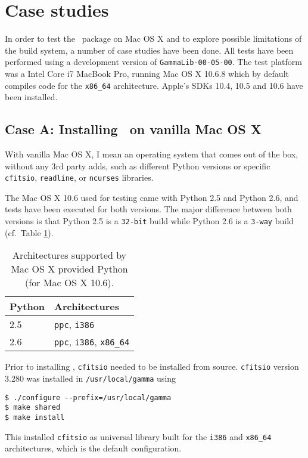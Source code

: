 \documentclass{article}[12pt,a4]
\begin{document}
\section{Case studies}

In order to test the \this\ package on Mac OS X and to explore possible limitations of the build
system, a number of case studies have been done.
All tests have been performed using a development version of {\tt GammaLib-00-05-00}.
The test platform was a Intel Core i7 MacBook Pro, running Mac OS X 10.6.8
which by default compiles code for the {\tt x86\_64} architecture. 
Apple's SDKs 10.4, 10.5 and 10.6 have been installed.


\subsection{Case A: Installing \this\ on vanilla Mac OS X}

With vanilla Mac OS X, I mean an operating system that comes out of the box, without any
3rd party adds, such as different Python versions or specific {\tt cfitsio}, {\tt readline}, or
{\tt ncurses} libraries.

The Mac OS X 10.6 used for testing came with Python 2.5 and Python 2.6, and tests have been executed
for both versions.
The major difference between both versions is that Python 2.5 is a {\tt 32-bit} build while
Python 2.6 is a {\tt 3-way} build (cf.~Table \ref{table:macpython}).

\begin{table}[!h]
  \center
  \begin{tabular}{ll}
  \hline
  Python & Architectures \\
  \hline
  2.5 & {\tt ppc}, {\tt i386} \\
  2.6 & {\tt ppc}, {\tt i386}, {\tt x86\_64} \\
  \hline
  \end{tabular}
  \caption{Architectures supported by Mac OS X provided Python (for Mac OS X 10.6).}
  \label{table:macpython}
\end{table}

Prior to installing \this, {\tt cfitsio} needed to be installed from source.
{\tt cfitsio} version 3.280 was installed in {\tt /usr/local/gamma} using 
{\small\begin{verbatim}
$ ./configure --prefix=/usr/local/gamma
$ make shared
$ make install
\end{verbatim}}
This installed {\tt cfitsio} as universal library built for the {\tt i386} and {\tt x86\_64} architectures,
which is the default configuration.
\end{document}
